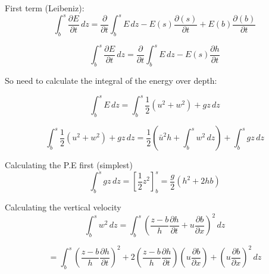 \documentclass[12pt]{article}
\begin{document}
First term (Leibeniz):
\[\int_b^{s} \frac{\partial E}{\partial t} \, dz = \frac{\partial}{\partial t}\int_b^{s}E \, dz - E(s)\frac{\partial(s)}{\partial t} + E(b)\frac{\partial(b)}{\partial t}  \]

\[\int_b^{s} \frac{\partial E}{\partial t} \, dz = \frac{\partial}{\partial t}\int_b^{s}E \, dz - E(s)\frac{\partial h}{\partial t}  \]

So need to calculate the integral of the energy over depth:

\[\int_b^sE \, dz = \int_b^s \frac{1}{2}\left(u^2 + w^2\right) + gz \, dz\]

\[\int_b^s \frac{1}{2}\left(u^2+ w^2\right) + gz \, dz = \frac{1}{2}\left(\bar{u}^2h + \int_b^s  w^2 \, dz \right) + \int_b^s gz \, dz \]

Calculating the P.E first (simplest)
\[\int_b^s gz \, dz = \left[\frac{1}{2}z^2\right]^s_b = \frac{g}{2}\left(h^2 + 2hb\right)\]

Calculating the vertical velocity
\[\int_b^s  w^2 \, dz = \int_b^s  \left(\frac{z - b}{h} \frac{\partial h}{\partial t} + u \frac{\partial b}{\partial x}\right)^2 \, dz \]

\[ = \int_b^s  \left(\frac{z - b}{h} \frac{\partial h}{\partial t}\right)^2 + 2\left(\frac{z - b}{h} \frac{\partial h}{\partial t}\right)\left(u \frac{\partial b}{\partial x}\right) + \left( u \frac{\partial b}{\partial x} \right)^2 \, dz  \]



\end{document}
